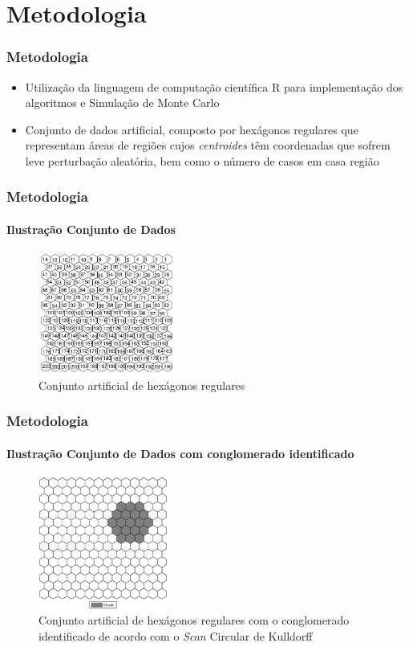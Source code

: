 \documentclass[aspectratio=169]{beamer}
\begin{document}
\section{Metodologia}
\begin{frame}
\frametitle{Metodologia}

\begin{itemize}
\item Utilização da linguagem de computação científica R para implementação dos algoritmos e Simulação de Monte Carlo
\item Conjunto de dados artificial, composto por hexágonos regulares que representam áreas de regiões cujos \textit{centroides} têm coordenadas que sofrem leve perturbação aleatória, bem como o número de casos em casa região
\end{itemize}
\end{frame}

\begin{frame}
\frametitle{Metodologia}
\framesubtitle{Ilustração Conjunto de Dados}

\begin{figure}[!htb]
\caption{Conjunto artificial de hexágonos regulares}
\includegraphics[width=0.4\textwidth]{mapa_hex}
\end{figure}

\end{frame}

\begin{frame}
\frametitle{Metodologia}
\framesubtitle{Ilustração Conjunto de Dados com conglomerado identificado}

\begin{figure}[!htb]
\caption{Conjunto artificial de hexágonos regulares com o conglomerado identificado de acordo com o \textit{Scan} Circular de Kulldorff}
\includegraphics[width=0.38\textwidth, trim = 30 30 30 30]{cluster}
\end{figure}

\end{frame}
\end{document}
